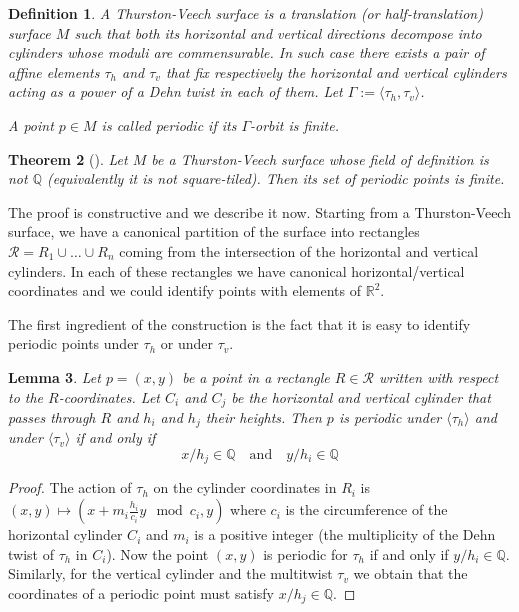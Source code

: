 \documentclass[a4paper,12pt]{article}
\def\bR{\mathbb{R}}
\def\bQ{\mathbb{Q}}
\newtheorem{definition}{Definition}
\newtheorem{lemma}[definition]{Lemma}
\newtheorem{theorem}[definition]{Theorem}
\begin{document}
\begin{definition}
A \emph{Thurston-Veech surface} is a translation (or half-translation) surface $M$ such
that both its horizontal and vertical directions decompose into cylinders
whose moduli are commensurable. In such case there exists a pair of affine
elements $\tau_h$ and $\tau_v$ that fix respectively the horizontal and
vertical cylinders acting as a power of a Dehn twist in each of them.
Let $\Gamma := \langle \tau_h, \tau_v \rangle$.

A point $p \in M$ is called \emph{periodic} if its $\Gamma$-orbit is finite.
\end{definition}

\begin{theorem}[\cite{ChowdhuryEverettFreedmanLee}]
Let $M$ be a Thurston-Veech surface whose field of definition is not $\bQ$
(equivalently it is not square-tiled). Then its set of periodic points
is finite.
\end{theorem}

The proof is constructive and we describe it now.
Starting from a Thurston-Veech surface, we have a canonical partition of the
surface into rectangles $\mathcal{R} = R_1 \cup \ldots \cup R_n$ coming
from the intersection of the horizontal and vertical cylinders. In each
of these rectangles we have canonical horizontal/vertical coordinates and we could
identify points with elements of $\bR^2$. 

The first ingredient of the construction is the fact that it is easy to identify
periodic points under $\tau_h$ or under $\tau_v$.
\begin{lemma}
Let $p=(x,y)$ be a point in a rectangle $R \in \mathcal{R}$ written with
respect to the $R$-coordinates. Let $C_i$ and $C_j$ be the horizontal
and vertical cylinder that passes through $R$ and $h_i$ and $h_j$
their heights. Then $p$ is periodic under $\langle \tau_h \rangle$ and
under $\langle \tau_v \rangle$ if and only if 
\begin{equation}
\label{eq:tauh:tauv:periodicity}
x / h_j \in \bQ
\quad \text{and} \quad
y / h_i \in \bQ
\end{equation}
\end{lemma}

\begin{proof}
The action of $\tau_h$ on the cylinder coordinates in $R_i$ is $(x,y) \mapsto
(x + m_i \frac{h_i}{c_i} y \mod c_i, y)$ where $c_i$ is the circumference of
the horizontal cylinder $C_i$ and $m_i$ is a positive integer (the multiplicity
of the Dehn twist of $\tau_h$ in $C_i$). Now the point $(x, y)$ is periodic for
$\tau_h$ if and only if $y/h_i \in \bQ$. Similarly, for the vertical cylinder
and the multitwist $\tau_v$ we obtain that the coordinates of a periodic point
must satisfy $x / h_j \in \bQ$.
\end{proof}
\end{document}
